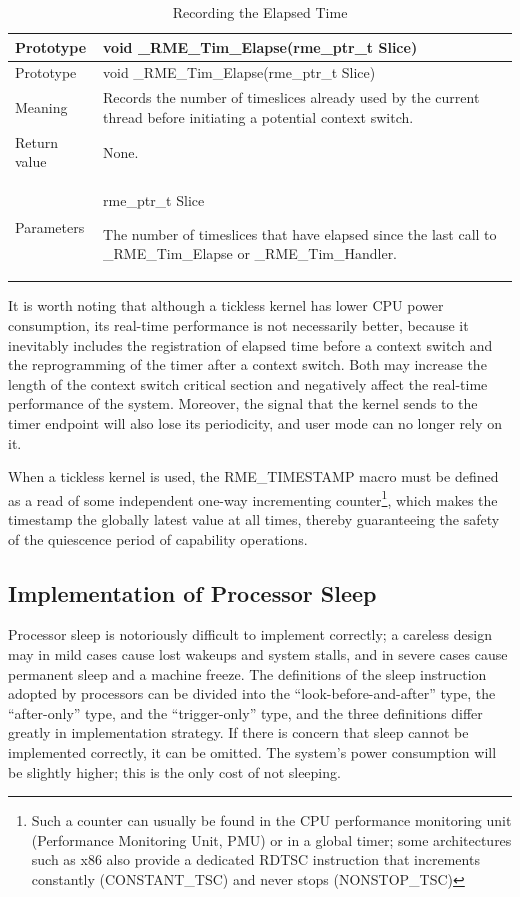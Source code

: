 \begin{xltabular}{\textwidth}{@{}>{\hsize\raggedright\arraybackslash}X>{\hsize\raggedright\arraybackslash}X@{}}
\caption{Recording the Elapsed Time}\label{tab:9-2-record-elapsed-time}\\
\toprule
Prototype & void \_RME\_Tim\_Elapse(rme\_ptr\_t Slice)\tabularnewline
\endfirsthead
\toprule
Prototype & void \_RME\_Tim\_Elapse(rme\_ptr\_t Slice)\tabularnewline
\midrule
\endhead
\bottomrule
\endlastfoot
Meaning &
Records the number of timeslices already used by the current thread before initiating a potential context switch.\tabularnewline
Return value & None.\tabularnewline
Parameters\strut
 & rme\_ptr\_t Slice

The number of timeslices that have elapsed since the last call to \_RME\_Tim\_Elapse or \_RME\_Tim\_Handler.\strut
\tabularnewline
\end{xltabular}
\nopagebreak[4]

It is worth noting that although a tickless kernel has lower CPU power consumption, its real-time performance is not necessarily better, because it inevitably includes the registration of elapsed time before a context switch and the reprogramming of the timer after a context switch. Both may increase the length of the context switch critical section and negatively affect the real-time performance of the system. Moreover, the signal that the kernel sends to the timer endpoint will also lose its periodicity, and user mode can no longer rely on it.

When a tickless kernel is used, the RME\_TIMESTAMP macro must be defined as a read of some independent one-way incrementing counter\footnote{Such a counter can usually be found in the CPU performance monitoring unit (Performance Monitoring
  Unit, PMU) or in a global timer; some architectures such as x86 also provide a dedicated RDTSC instruction that increments constantly (CONSTANT\_TSC) and never stops (NONSTOP\_TSC)}, which makes the timestamp the globally latest value at all times, thereby guaranteeing the safety of the quiescence period of capability operations.

\subsection{Implementation of Processor Sleep}\label{subsec:9-processor-sleep}

Processor sleep is notoriously difficult to implement correctly; a careless design may in mild cases cause lost wakeups and system stalls, and in severe cases cause permanent sleep and a machine freeze. The definitions of the sleep instruction adopted by processors can be divided into the ``look-before-and-after'' type, the ``after-only'' type, and the ``trigger-only'' type, and the three definitions differ greatly in implementation strategy. If there is concern that sleep cannot be implemented correctly, it can be omitted. The system's power consumption will be slightly higher; this is the only cost of not sleeping.

